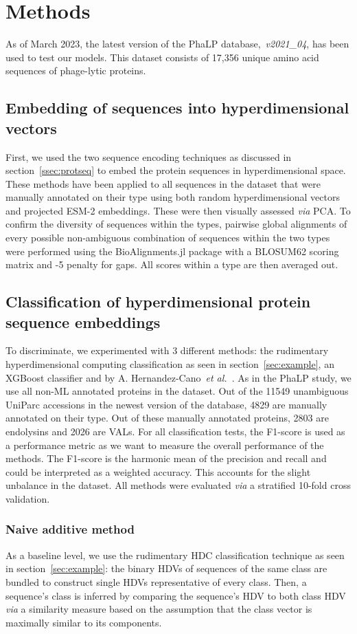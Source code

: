 \section{Methods}
As of March 2023, the latest version of the PhaLP database,~\textit{v2021\_04}, has been used to test our models. This dataset consists of 17,356 unique amino acid sequences of phage-lytic proteins.
\subsection*{Embedding of sequences into hyperdimensional vectors}
First, we used the two sequence encoding techniques as discussed in section~\ref{ssec:protseq} to embed the protein sequences in hyperdimensional space. These methods have been applied to all sequences in the dataset that were manually annotated on their type using both random hyperdimensional vectors and projected ESM-2 embeddings. These were then visually assessed \textit{via} PCA. To confirm the diversity of sequences within the types, pairwise global alignments of every possible non-ambiguous combination of sequences within the two types were performed using the BioAlignments.jl package with a BLOSUM62 scoring matrix and -5 penalty for gaps. All scores within a type are then averaged out.

\subsection*{Classification of hyperdimensional protein sequence embeddings}
To discriminate, we experimented with 3 different methods: the rudimentary hyperdimensional computing classification as seen in section~\ref{sec:example}, an XGBoost classifier and  by A. Hernandez-Cano~\textit{et al.}~\cite{onlinehd}. As in the PhaLP study, we use all non-ML annotated proteins in the dataset. Out of the 11549 unambiguous UniParc accessions in the newest version of the database, 4829 are manually annotated on their type. Out of these manually annotated proteins, 2803 are endolysins and 2026 are VALs. For all classification tests, the F1-score is used as a performance metric as we want to measure the overall performance of the methods. The F1-score is the harmonic mean of the precision and recall and could be interpreted as a weighted accuracy. This accounts for the slight unbalance in the dataset. All methods were evaluated \textit{via} a stratified 10-fold cross validation.
\subsubsection*{Naive additive method}
As a baseline level, we use the rudimentary HDC classification technique as seen in section~\ref{sec:example}: the binary HDVs of sequences of the same class are bundled to construct single HDVs representative of every class. Then, a sequence's class is inferred by comparing the sequence's HDV to both class HDV \textit{via} a similarity measure based on the assumption that the class vector is maximally similar to its components.
